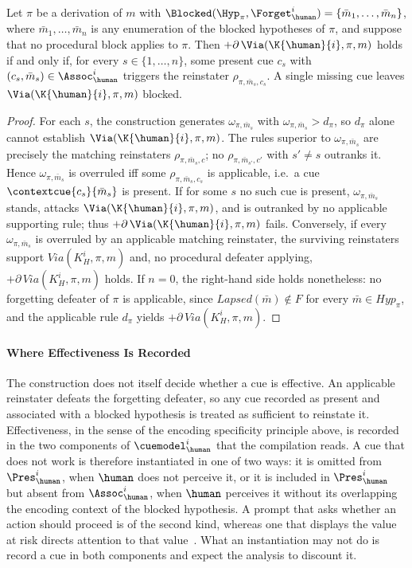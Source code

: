 \begin{lemma}
\label{Lem:PerHypothesis}
    Let $\pi$ be a derivation of $m$ with $\Blocked(\Hyp_\pi, \Forget_\human^{i}) = \{\bar{m}_1, \ldots, \bar{m}_n\}$, where $\bar{m}_1,\ldots,\bar{m}_n$ is any enumeration of the blocked hypotheses of $\pi$, and suppose that no procedural block applies to $\pi$. Then $+\partial\,\Via(\K{\human}{i}, \pi, m)$ holds if and only if, for every $s \in \{1, \ldots, n\}$, some present cue $c_s$ with $(c_s, \bar{m}_s) \in \Assoc_{\human}^{i}$ triggers the reinstater $\rho_{\pi,\bar{m}_s, c_s}$. A single missing cue leaves $\Via(\K{\human}{i}, \pi, m)$ blocked.\end{lemma}
\begin{proof}
    For each $s$, the construction generates $\omega_{\pi,\bar{m}_s}$ with $\omega_{\pi,\bar{m}_s} > d_\pi$, so $d_\pi$ alone cannot establish $\Via(\K{\human}{i}, \pi, m)$. The rules superior to $\omega_{\pi,\bar{m}_s}$ are precisely the matching reinstaters $\rho_{\pi,\bar{m}_s,c}$; no $\rho_{\pi,\bar{m}_{s'},c'}$ with $s' \neq s$ outranks it. Hence $\omega_{\pi,\bar{m}_s}$ is overruled iff some $\rho_{\pi,\bar{m}_s,c_s}$ is applicable, i.e.\ a cue $\contextcue{c_s}{\bar{m}_s}$ is present. If for some $s$ no such cue is present, $\omega_{\pi,\bar{m}_s}$ stands, attacks $\Via(\K{\human}{i}, \pi, m)$, and is outranked by no applicable supporting rule; thus $+\partial\,\Via(\K{\human}{i}, \pi, m)$ fails. Conversely, if every $\omega_{\pi,\bar m_s}$ is overruled by an applicable matching reinstater, the surviving reinstaters support $\mathit{Via}(K^i_H,\pi,m)$ and, no procedural defeater applying, $+\partial\,\mathit{Via}(K^i_H,\pi,m)$ holds. If $n=0$, the right-hand side holds nonetheless: no forgetting defeater of $\pi$ is applicable, since $\mathit{Lapsed}(\bar m)\notin F$ for every $\bar m\in\mathit{Hyp}_\pi$, and the applicable rule $d_\pi$ yields $+\partial\,\mathit{Via}(K^i_H,\pi,m)$.
    \end{proof}

\paragraph{Where Effectiveness Is Recorded}
The construction does not itself decide whether a cue is effective. An applicable reinstater defeats the forgetting defeater, so any cue recorded as present and associated with a blocked hypothesis is treated as sufficient to reinstate it. Effectiveness, in the sense of the encoding specificity principle above, is recorded in the two components of $\cuemodel_{\human}^{i}$ that the compilation reads. A cue that does not work is therefore instantiated in one of two ways: it is omitted from $\Pres_{\human}^{i}$, when $\human$ does not perceive it, or it is included in $\Pres_{\human}^{i}$ but absent from $\Assoc_{\human}^{i}$, when $\human$ perceives it without its overlapping the encoding context of the blocked hypothesis. A prompt that asks whether an action should proceed is of the second kind, whereas one that displays the value at risk directs attention to that value~\cite{bravolillo2013attention}. What an instantiation may not do is record a cue in both components and expect the analysis to discount it.

